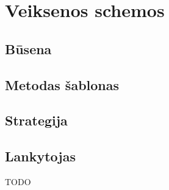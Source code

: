 
\section{Veiksenos schemos}


\subsection{Būsena}


\subsection{Metodas šablonas}


\subsection{Strategija}


\subsection{Lankytojas}


TODO
